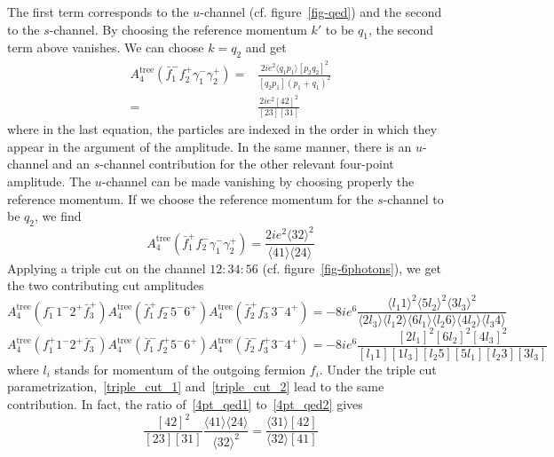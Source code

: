 The first term corresponds to the $u$-channel (cf. figure~\ref{fig-qed}) and the second to the $s$-channel.
By choosing the reference momentum $k'$ to be $q_1$, the second term above vanishes. 
We can choose $k = q_2$ and get 
\begin{equation}\label{4pt_qed1}
\begin{split}
A_{4}^{\mathrm{tree}}(\bar{f}_1^- f_2^+ \gamma_1^-\gamma_2^+) 
= &
\frac{2ie^2\langle q_1 p_1 \rangle[p_2 q_2]^2}{[q_2 p_1](p_1+q_1)^2}
\\ 
= &
\frac{2ie^2[42]^2}{[23][31]}
\end{split}
\end{equation}
where in the last equation, the particles are indexed in the order in which they appear in the argument of the amplitude.
In the same manner, there is an $u$-channel and an $s$-channel contribution for the other relevant four-point amplitude. 
The $u$-channel can be made vanishing by choosing properly the reference momentum. 
If we choose the reference momentum for the $s$-channel to be $q_2$, we find 
\begin{equation}\label{4pt_qed2}
A_4^{\mathrm{tree}}(\bar{f}_1^+ f_2^- \gamma_1^- \gamma_2^+) = 
\frac{2ie^2\langle 32\rangle^2}{\langle 41 \rangle\langle 24\rangle}
\end{equation}
Applying a triple cut on the channel $12:34:56$ (cf. figure~\ref{fig-6photons}), we get the two contributing cut amplitudes
\begin{equation}\label{triple_cut_1}
A_{4}^{\mathrm{tree}}(f_1^- 1^-2^+\bar{f}_3^+)
A_4^{\mathrm{tree}}(\bar{f}_1^+f_2^-5^-6^+)
A_4^{\mathrm{tree}}(\bar{f}_2^+ f_3^-3^-4^+)
=
-8ie^6\frac{\langle l_1 1\rangle^2 \langle 5l_2 \rangle^2\langle 3l_3\rangle^2}{\langle2 l_3\rangle\langle l_1 2\rangle\langle 6 l_1 \rangle\langle l_2 6\rangle\langle 4 l_2\rangle\langle l_3 4\rangle}
\end{equation}
\begin{equation}\label{triple_cut_2}
A_{4}^{\mathrm{tree}}(f_1^+ 1^-2^+\bar{f}_3^-)
A_4^{\mathrm{tree}}(\bar{f}_1^-f_2^+5^-6^+)
A_4^{\mathrm{tree}}(\bar{f}_2^- f_3^+3^-4^+)
=
-8ie^6\frac{[2l_1]^2[6l_2]^2[4l_3]^2}{[l_1 1 ][1l_3][l_2 5][5l_1][l_2 3][3l_3]}
\end{equation}
where $l_i$ stands for momentum of the outgoing fermion $f_i$.
%
\iffalse
Under the triple cut parametrization,~\cref{triple_cut_1} and~\cref{triple_cut_2} lead to the same contribution. 
In fact, the ratio of~\cref{4pt_qed1} to~\cref{4pt_qed2} gives
\begin{equation}
\frac{[42]^2}{[23][31]}\frac{\langle 41\rangle\langle 24\rangle}{\langle 32 \rangle^2} = \frac{\langle 31\rangle[42]}{\langle 32 \rangle[41]} 
\end{equation} 
